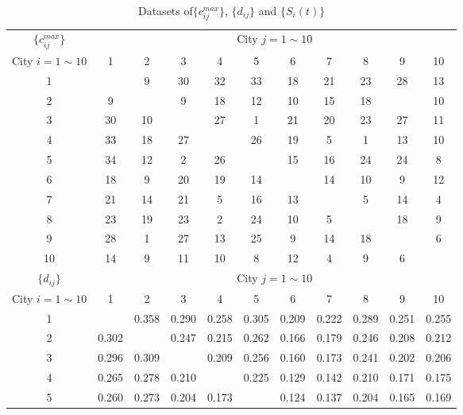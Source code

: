 \documentclass[11pt,twocolumn]{article}
\begin{document}
\begin{spacing}{1.6}
\begin{table}[btp]
    \centering
    \caption{Datasets of$\{c_{ij}^{max}\}$, $\{d_{ij}\}$ and $\{S_i(t)\}$}
    \label{table3}
    \setlength{\tabcolsep}{8pt}
    \renewcommand{\arraystretch}{1.2}
\begin{tabular}{c|cccccccccc}
    \toprule
    $\{c_{ij}^{max}\}$ & \multicolumn{10}{c}{City $j=1\sim10$} \\
    City $i=1\sim10$ & 1 & 2 & 3 & 4 & 5 & 6 & 7 & 8 & 9 & 10 \\ \hline
    1  &      & 9    & 30   & 32   & 33   & 18   & 21   & 23   & 28   & 13   \\
    2  & 9    &      & 9    & 18   & 12   & 10   & 15   & 18   &      & 10   \\
    3  & 30   & 10   &      & 27   & 1    & 21   & 20   & 23   & 27   & 11   \\
    4  & 33   & 18   & 27   &      & 26   & 19   & 5    & 1    & 13   & 10   \\
    5  & 34   & 12   & 2    & 26   &      & 15   & 16   & 24   & 24   & 8    \\
    6  & 18   & 9    & 20   & 19   & 14   &      & 14   & 10   & 9    & 12   \\
    7  & 21   & 14   & 21   & 5    & 16   & 13   &      & 5    & 14   & 4    \\
    8  & 23   & 19   & 23   & 2    & 24   & 10   & 5    &      & 18   & 9    \\
    9  & 28   & 1    & 27   & 13   & 25   & 9    & 14   & 18   &      & 6    \\
    10 & 14   & 9    & 11   & 10   & 8    & 12   & 4    & 9    & 6    &      \\
    \toprule
    \toprule
    $\{d_{ij}\}$ & \multicolumn{10}{c}{City $j=1\sim10$} \\
    City $i=1\sim10$ & 1 & 2 & 3 & 4 & 5 & 6 & 7 & 8 & 9 & 10 \\ \hline
    1 &  & 0.358 & 0.290 & 0.258 & 0.305 & 0.209 & 0.222 & 0.289 & 0.251 & 0.255 \\ 
    2 & 0.302 &  & 0.247 & 0.215 & 0.262 & 0.166 & 0.179 & 0.246 & 0.208 & 0.212 \\ 
    3 & 0.296 & 0.309 &  & 0.209 & 0.256 & 0.160 & 0.173 & 0.241 & 0.202 & 0.206 \\ 
    4 & 0.265 & 0.278 & 0.210 &  & 0.225 & 0.129 & 0.142 & 0.210 & 0.171 & 0.175 \\ 
    5 & 0.260 & 0.273 & 0.204 & 0.173 &  & 0.124 & 0.137 & 0.204 & 0.165 & 0.169 \\ 

\end{tabular}
\end{table}
\end{spacing}
\end{document}
